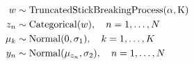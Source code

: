 \begin{equation}
  \label{eq:imm}
  \begin{aligned}
    w &\sim \mathrm{TruncatedStickBreakingProcess(\alpha, K)} \\
    z_{n} &\sim \mathrm{Categorical}(w), \quad n = 1, \ldots, N \\
    \mu_{k} &\sim \mathrm{Normal}(0, \sigma_{1}), \quad k = 1, \ldots, K \\
    y_{n} &\sim \mathrm{Normal}(\mu_{z_{n}}, \sigma_{2}), \quad n = 1, \ldots, N
  \end{aligned}
\end{equation}







